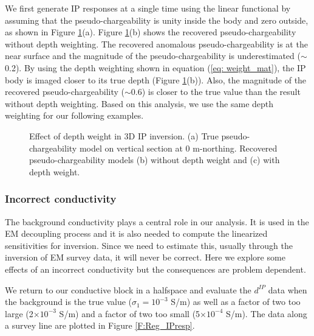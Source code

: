 \documentclass[extra,mreferee]{gji}
\newcommand{\dip}{d^{IP}}
\begin{document}
We first generate IP responses at a single time using the linear functional by assuming that the pseudo-chargeability is unity inside the body and zero outside, as shown in  Figure \ref{F:Depthweight}(a). 
Figure \ref{F:Depthweight}(b) shows the recovered pseudo-chargeability without depth weighting. 
The recovered anomalous pseudo-chargeability is  at the near surface and the magnitude of the pseudo-chargeability is underestimated ($\sim$0.2). 
By using the depth weighting shown in equation (\ref{eq: weight_mat}),  the IP body is imaged closer to its true depth (Figure \ref{F:Depthweight}(b)). 
Also, the magnitude of the recovered pseudo-chargeability ($\sim$0.6) is closer to the true value than the result without depth weighting. 
Based on this analysis, we use the same depth weighting for our  following examples. 

\begin{figure}
  \caption{Effect of depth weight in 3D IP inversion. (a) True pseudo-chargeability model on vertical section at 0 m-northing. Recovered pseudo-chargeability models (b) without depth weight and (c) with depth weight.}
  \label{F:Depthweight}
\end{figure}
\clearpage

\subsubsection{Incorrect conductivity}
The background conductivity plays a central role in our analysis. It is used in the EM decoupling process and it is also needed to compute the linearized sensitivities for inversion. Since we need to estimate this, usually through the inversion of EM survey data, it will never be correct. Here we explore some effects of an incorrect conductivity but  the consequences are problem dependent.

We return to our conductive block in a halfspace and evaluate the $\dip$ data when the background is the true value ($\sigma_1 = 10^{-3}$ S/m) as well as a factor of two too large (2$\times10^{-3}$ S/m) and a factor of two too small (5$\times10^{-4}$ S/m). The data along a survey line are plotted in Figure \ref{F:Reg_IPresp}.
\end{document}

